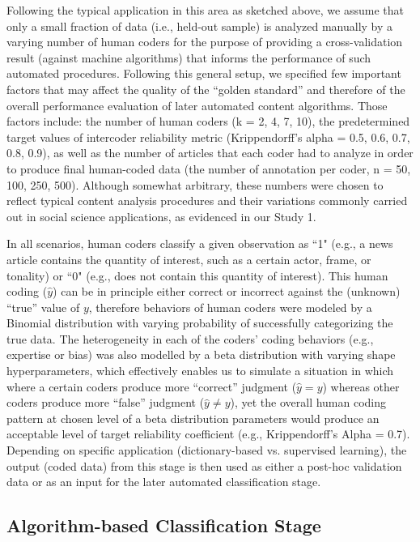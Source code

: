 \documentclass[man, 12pt, a4paper, nolmodern, noextraspace]{apa6}
\begin{document}
    Following the typical application in this area as sketched above, we assume that only a small fraction of data (i.e., held-out sample) is analyzed manually by a varying number of human coders for the purpose of providing a cross-validation result (against machine algorithms) that informs the performance of such automated procedures. Following this general setup, we specified few important factors that may affect the quality of the “golden standard” and therefore of the overall performance evaluation of later automated content algorithms. Those factors include: the number of human coders (k = 2, 4, 7, 10), the predetermined target values of intercoder reliability metric (Krippendorff’s alpha = 0.5, 0.6, 0.7, 0.8, 0.9), as well as the number of articles that each coder had to analyze in order to produce final human-coded data (the number of annotation per coder, n = 50, 100, 250, 500). Although somewhat arbitrary, these numbers were chosen to reflect typical content analysis procedures and their variations commonly carried out in social science applications, as evidenced in our Study 1. 
    
    In all scenarios, human coders classify a given observation as ``1" (e.g., a news article contains the quantity of interest, such as a certain actor, frame, or tonality) or ``0" (e.g., does not contain this quantity of interest). This human coding ($\hat{y}$) can be in principle either correct or incorrect against the (unknown) “true” value of $y$, therefore behaviors of human coders were modeled by a Binomial distribution with varying probability of successfully categorizing the true data. The heterogeneity in each of the coders’ coding behaviors (e.g., expertise or bias) was also modelled by a beta distribution with varying shape hyperparameters, which effectively enables us to simulate a situation in which where a certain coders produce more “correct” judgment ($\hat{y} = y$) whereas other coders produce more “false” judgment ($\hat{y} \neq y$), yet the overall human coding pattern at chosen level of a beta distribution parameters would produce an acceptable level of target reliability coefficient (e.g., Krippendorff’s Alpha = 0.7). Depending on specific application (dictionary-based vs. supervised learning), the output (coded data) from this stage is then used as either a post-hoc validation data or as an input for the later automated classification stage. 
    
    \subsection{Algorithm-based Classification Stage}
    
\end{document}
